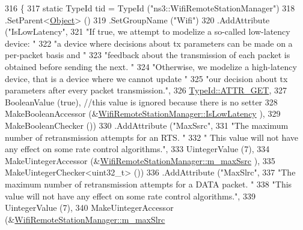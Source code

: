 \begin{DoxyCode}
316 \{
317   \textcolor{keyword}{static} TypeId tid = TypeId (\textcolor{stringliteral}{"ns3::WifiRemoteStationManager"})
318     .SetParent<\hyperlink{classns3_1_1Object_a40860402e64d8008fb42329df7097cdb}{Object}> ()
319     .SetGroupName (\textcolor{stringliteral}{"Wifi"})
320     .AddAttribute (\textcolor{stringliteral}{"IsLowLatency"},
321                    \textcolor{stringliteral}{"If true, we attempt to modelize a so-called low-latency device: "}
322                    \textcolor{stringliteral}{"a device where decisions about tx parameters can be made on a per-packet basis and "}
323                    \textcolor{stringliteral}{"feedback about the transmission of each packet is obtained before sending the next. "}
324                    \textcolor{stringliteral}{"Otherwise, we modelize a high-latency device, that is a device where we cannot update "}
325                    \textcolor{stringliteral}{"our decision about tx parameters after every packet transmission."},
326                    \hyperlink{classns3_1_1TypeId_a3ab7b43b95f96391c514d609ca60e542a3dd4b476c9b257285c177d6c414b5fd0}{TypeId::ATTR\_GET},
327                    BooleanValue (\textcolor{keyword}{true}), \textcolor{comment}{//this value is ignored because there is no setter}
328                    MakeBooleanAccessor (&\hyperlink{classns3_1_1WifiRemoteStationManager_a3b5ae71dce8e994b493ddfdb1d2f57f6}{WifiRemoteStationManager::IsLowLatency}
      ),
329                    MakeBooleanChecker ())
330     .AddAttribute (\textcolor{stringliteral}{"MaxSsrc"},
331                    \textcolor{stringliteral}{"The maximum number of retransmission attempts for an RTS. "}
332                    \textcolor{stringliteral}{" This value will not have any effect on some rate control algorithms."},
333                    UintegerValue (7),
334                    MakeUintegerAccessor (&\hyperlink{classns3_1_1WifiRemoteStationManager_a25cf937b8babffbe071a8d5ef5ae9f7b}{WifiRemoteStationManager::m\_maxSsrc}
      ),
335                    MakeUintegerChecker<uint32\_t> ())
336     .AddAttribute (\textcolor{stringliteral}{"MaxSlrc"},
337                    \textcolor{stringliteral}{"The maximum number of retransmission attempts for a DATA packet. "}
338                    \textcolor{stringliteral}{"This value will not have any effect on some rate control algorithms."},
339                    UintegerValue (7),
340                    MakeUintegerAccessor (&\hyperlink{classns3_1_1WifiRemoteStationManager_ac32ca2716dfdae73e1399ef0845c50eb}{WifiRemoteStationManager::m\_maxSlrc}

\end{DoxyCode}
